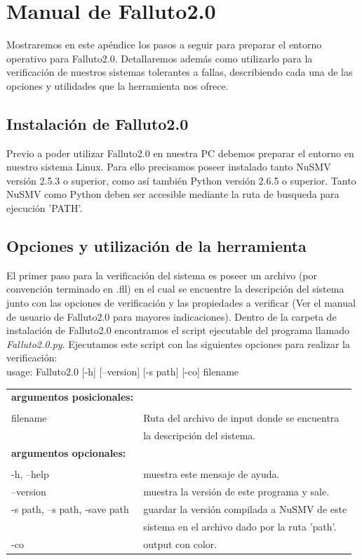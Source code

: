 \documentclass[titlepage, 12pt]{book}
\begin{document}
\chapter{Manual de Falluto2.0}
Mostraremos en este apéndice los pasos a seguir para preparar el entorno operativo para Falluto2.0. Detallaremos además como utilizarlo para la verificación de nuestros sistemas tolerantes a fallas, describiendo cada una de las opciones y utilidades que la herramienta nos ofrece.

\section{Instalación de Falluto2.0}
Previo a poder utilizar Falluto2.0 en nuestra PC debemos preparar el entorno en nuestro sistema Linux. Para ello precisamos poseer instalado tanto NuSMV versión 2.5.3 o superior, como así también Python versión 2.6.5 o superior. Tanto NuSMV como Python deben ser accesible mediante la ruta de busqueda para ejecución 'PATH'.

\section{Opciones y utilización de la herramienta}
El primer paso para la verificación del sistema es poseer un archivo (por convención terminado en .fll) en el cual se encuentre la descripción del sistema junto con las opciones de verificación y las propiedades a verificar (Ver el manual de usuario de Falluto2.0 para mayores indicaciones). Dentro de la carpeta de instalación de Falluto2.0 encontramos el script ejecutable del programa llamado \textit{Falluto2.0.py}. Ejecutamos este script con las siguientes opciones para realizar la verificación:\\


\noindent usage: Falluto2.0 [-h] [--version] [-s path] [-co] filename\\


\begin{tabular}{ll}
\textbf{argumentos posicionales:}\\\\
filename & Ruta del archivo de input donde se encuentra \\
         & la descripción del sistema.\\
\textbf{argumentos opcionales:} & \\\\
-h, --help          & muestra este mensaje de ayuda.\\
--version           & muestra la versión de este programa y sale.\\
-s path, --s path, -save path & guardar la versión compilada a NuSMV de este \\
                              & sistema en el archivo dado por la ruta 'path'.\\
-co 		        & output con color.\\
\end{tabular}
\end{document}
